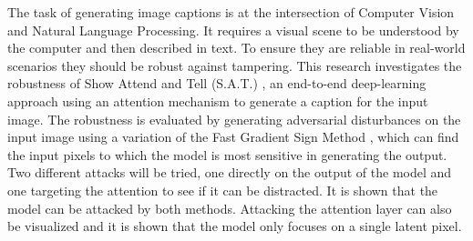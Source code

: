 The task of generating image captions is at the intersection of Computer Vision and Natural Language Processing. It requires a visual scene to be understood by the computer and then described in text. To ensure they are reliable in real-world scenarios they should be robust against tampering. This research investigates the robustness of Show Attend and Tell (S.A.T.) \cite{xu2016show}, an end-to-end deep-learning approach using an attention mechanism\cite{attention_bahdanau} to generate a caption for the input image. The robustness is evaluated by generating adversarial disturbances on the input image using a variation of the Fast Gradient Sign Method \cite{goodfellow2015explaining}, which can find the input pixels to which the model is most sensitive in generating the output. Two different attacks will be tried, one directly on the output of the model and one targeting the attention to see if it can be distracted. It is shown that the model can be attacked by both methods. Attacking the attention layer can also be visualized and it is shown that the model only focuses on a single latent pixel.